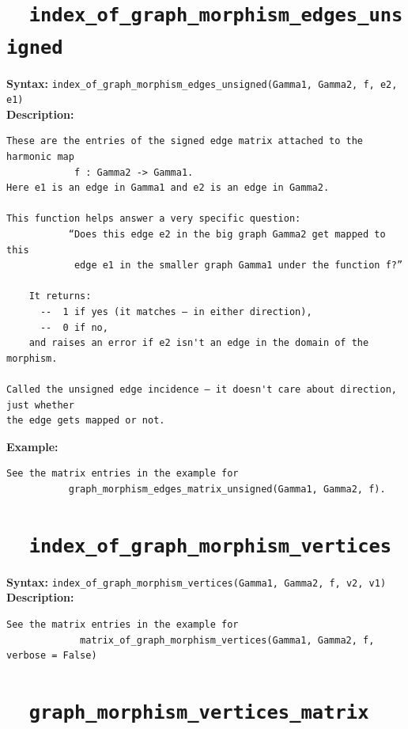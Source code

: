 \documentclass{article}
\begin{document}
\section{\tt \ \  index\_of\_graph\_morphism\_edges\_unsigned}
  
\textbf{Syntax:} \verb}index_of_graph_morphism_edges_unsigned(Gamma1, Gamma2, f, e2, e1)}\\

\textbf{Description:}
\begin{verbatim}
These are the entries of the signed edge matrix attached to the harmonic map 
            f : Gamma2 -> Gamma1.
Here e1 is an edge in Gamma1 and e2 is an edge in Gamma2.

This function helps answer a very specific question:
           “Does this edge e2 in the big graph Gamma2 get mapped to this 
            edge e1 in the smaller graph Gamma1 under the function f?”

    It returns:
      --  1 if yes (it matches — in either direction),
      --  0 if no,
    and raises an error if e2 isn't an edge in the domain of the morphism.

Called the unsigned edge incidence — it doesn't care about direction, just whether 
the edge gets mapped or not.
\end{verbatim}

\textbf{Example:}
\begin{verbatim}
See the matrix entries in the example for 
           graph_morphism_edges_matrix_unsigned(Gamma1, Gamma2, f).
\end{verbatim}

\section{\tt \ \ index\_of\_graph\_morphism\_vertices}
  
\textbf{Syntax:} \verb}index_of_graph_morphism_vertices(Gamma1, Gamma2, f, v2, v1)}\\

\textbf{Description:}
\begin{verbatim}
See the matrix entries in the example for 
             matrix_of_graph_morphism_vertices(Gamma1, Gamma2, f, verbose = False)
\end{verbatim}

\section{\tt \ \  graph\_morphism\_vertices\_matrix}
\end{document}
